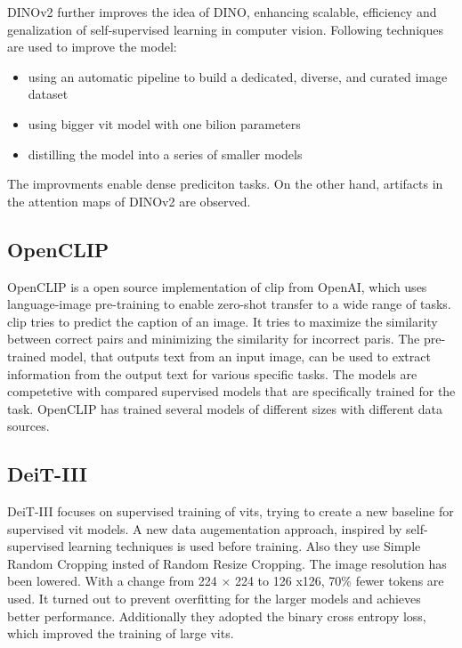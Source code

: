 \documentclass[conference]{IEEEtran}
\begin{document}
  \mbox{DINOv2} further improves the idea of \mbox{DINO}, enhancing scalable, efficiency and genalization of self-supervised learning in computer vision. Following techniques are used to improve the model:
  \begin{itemize}
    \item  using an automatic pipeline to build a dedicated, diverse, and curated image dataset
    \item  using bigger \ac{vit} model with one bilion parameters
    \item distilling the model into a series of smaller models \cite{dinov2}
  \end{itemize}
  The improvments enable dense prediciton tasks. On the other hand, artifacts in the attention maps of \mbox{DINOv2} are observed. \cite{registers}

  \subsection{OpenCLIP}
  \label{sec:openclip}

  \mbox{OpenCLIP} is a open source implementation of \ac{clip} \cite{clip} from OpenAI, which uses language-image pre-training to enable zero-shot transfer to a wide range of tasks. \ac{clip} tries to predict the caption of an image. It tries to maximize the similarity between correct pairs and minimizing the similarity for incorrect paris. The pre-trained model, that outputs text from an input image, can be used to extract information from the output text for various specific tasks. The models are competetive with compared supervised models that are specifically trained for the task. \cite{clip}
  \mbox{OpenCLIP} has trained several models of different sizes with different data sources. \cite{open-clip} 

  \subsection{\mbox{DeiT-III}}
  \label{sec:deit3}

  \mbox{DeiT-III} focuses on supervised training of \acp{vit}, trying to create a new baseline for supervised \ac{vit} models. A new data augementation approach, inspired by self-supervised learning techniques is used before training. Also they use Simple Random Cropping insted of Random Resize Cropping. The image resolution has been lowered. With a change from 224 × 224 to 126 x126, 70\% fewer tokens are used. It turned out to prevent overfitting for the larger models and achieves better performance. Additionally they adopted the binary cross entropy loss, which improved the training of large \acp{vit}. \cite{deit3}
\end{document}
